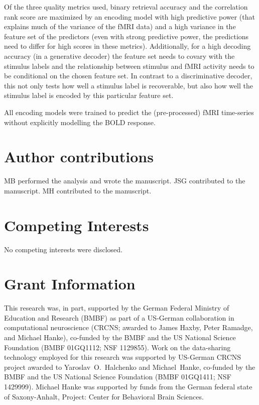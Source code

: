 Of the three quality metrics used, binary retrieval accuracy and the
correlation rank score are maximized by an encoding model with high predictive
power (that explains much of the variance of the f{MRI} data) and a high
variance in the feature set of the predictors (even with strong predictive
power, the predictions need to differ for high scores in these metrics).
Additionally, for a high decoding accuracy (in a generative decoder) the
feature set needs to covary with the stimulus labels and the relationship
between stimulus and f{MRI} activity needs to be conditional on the chosen
feature set. In contrast to a discriminative decoder, this not only tests how
well a stimulus label is recoverable, but also how well the stimulus label is
encoded by this particular feature set.

All encoding models were trained to predict the (pre-processed) f{MRI}
time-series without explicitly modelling the BOLD response. 





\section*{Author contributions}

MB performed the analysis and wrote the manuscript.
JSG contributed to the manuscript.
MH contributed to the manuscript.


\section*{Competing Interests}
No competing interests were disclosed.

\section*{Grant Information}

This research was, in part, supported by the German Federal Ministry of
Education and Research (BMBF) as part of a US-German collaboration in
computational neuroscience (CRCNS; awarded to James Haxby, Peter Ramadge, and
Michael Hanke), co-funded by the BMBF and the US National Science Foundation
(BMBF 01GQ1112; NSF 1129855).  Work on the data-sharing technology employed for
this research was supported by US-German CRCNS project awarded to
Yaroslav~O.~Halchenko and Michael~Hanke, co-funded by the BMBF and the US
National Science Foundation (BMBF 01GQ1411; NSF 1429999).  Michael Hanke was
supported by funds from the German federal state of Saxony-Anhalt, Project:
Center for Behavioral Brain Sciences.


